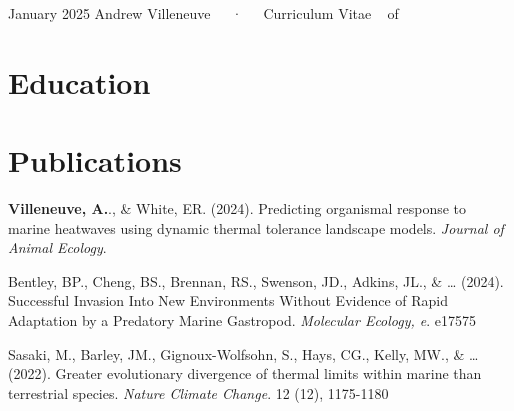\documentclass[11pt,a4paper,]{awesome-cv}
\begin{document}
\makecvheader

\makecvfooter
  {January 2025}
    {Andrew Villeneuve~~~·~~~Curriculum Vitae}
  {\thepage~ of \pageref{LastPage}~}





\section{Education}\label{education}

\begin{cventries}
    \vspace{-4.0mm}
    \vspace{-4.0mm}
    \vspace{-4.0mm}
\end{cventries}

\section{Publications}\label{publications}

\textbf{Villeneuve, A.}., \& White, ER. (2024). Predicting organismal
response to marine heatwaves using dynamic thermal tolerance landscape
models. \emph{Journal of Animal Ecology}.

Bentley, BP., Cheng, BS., Brennan, RS., Swenson, JD., Adkins, JL., \&
\ldots{} (2024). Successful Invasion Into New Environments Without
Evidence of Rapid Adaptation by a Predatory Marine Gastropod.
\emph{Molecular Ecology, e}. e17575

Sasaki, M., Barley, JM., Gignoux-Wolfsohn, S., Hays, CG., Kelly, MW., \&
\ldots{} (2022). Greater evolutionary divergence of thermal limits
within marine than terrestrial species. \emph{Nature Climate Change}. 12
(12), 1175-1180
\end{document}
